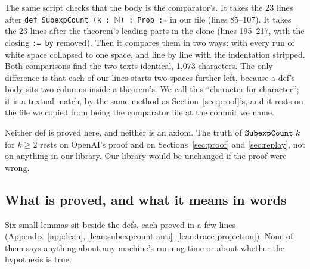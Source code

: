 The same script checks that the body is the comparator's. It takes the
23 lines after \texttt{def SubexpCount (k : }$\mathbb{N}$\texttt{) : Prop :=}
in our file (lines 85--107). It takes the 23 lines after the theorem's
leading parts in the clone (lines 195--217, with the closing \texttt{:= by}
removed). Then it compares them in two ways: with every run of white space
collapsed to one space, and line by line with the indentation stripped.
Both comparisons find the two texts identical, 1,073 characters. The
only difference is that each of our lines starts two spaces further
left, because a def's body sits two columns inside a theorem's. We call
this ``character for character''; it is a textual match, by the same
method as Section~\ref{sec:proof}'s, and it rests on the file we copied
from being the comparator file at the commit we name.

Neither def is proved here, and neither is an axiom. The truth of
\(\texttt{SubexpCount}\ k\) for $k \ge 2$ rests on OpenAI's proof and on
Sections~\ref{sec:proof} and \ref{sec:replay}, not on anything in our
library. Our library would be unchanged if the proof were wrong.

\subsection{What is proved, and what it means in words}
\label{sec:lean-lemmas}

Six small lemmas sit beside the defs, each proved in a few lines
(Appendix~\ref{app:lean}, \ref{lean:subexpcount-anti}--\ref{lean:trace-projection}).
None of them says anything about any machine's running time or about
whether the hypothesis is true.


